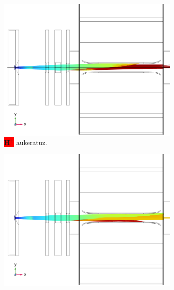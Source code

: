 \documentclass[12pt]{article}
\numberwithin{figure}{section}
\numberwithin{equation}{section}
\begin{document}
\begin{figure}[h]
    \centering
    \begin{subfigure}[b]{0.3\textwidth}
        \centering
        \includegraphics[width=\linewidth]{4 - Diseinua/h+_sistema_osoa.png}
        \caption{\colorbox{red}{$\mathbf{H_{ }^+}$} aukeratuz.}
        \label{fig:sistema_finala_osoa}
    \end{subfigure}
    \hspace{0.01\textwidth}
    \begin{subfigure}[b]{0.3\textwidth}
        \centering
        \includegraphics[width=\linewidth]{4 - Diseinua/h2+_sistema_osoa.png}

\end{subfigure}
\end{figure}
\end{document}
